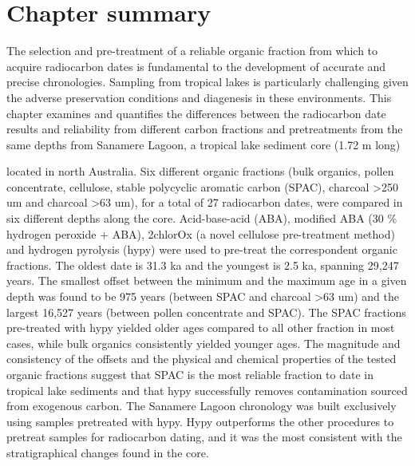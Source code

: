 \documentclass[
  12pt,
]{book}
\begin{document}
\hypertarget{chapter-summary}{%
\section{Chapter summary}\label{chapter-summary}}

The selection and pre-treatment of a reliable organic fraction from which to acquire radiocarbon dates is fundamental to the development of accurate and precise chronologies. Sampling from tropical lakes is particularly challenging given the adverse preservation conditions and diagenesis in these environments. This chapter examines and quantifies the differences between the radiocarbon date results and reliability from different carbon fractions and pretreatments from the same depths from Sanamere Lagoon, a tropical lake sediment core (1.72 m long)

located in north Australia. Six different organic fractions (bulk organics, pollen concentrate, cellulose, stable polycyclic aromatic carbon (SPAC), charcoal \textgreater250 um and charcoal \textgreater63 um), for a total of 27 radiocarbon dates, were compared in six different depths along the core. Acid-base-acid (ABA), modified ABA (30 \% hydrogen peroxide + ABA), 2chlorOx (a novel cellulose pre-treatment method) and hydrogen pyrolysis (hypy) were used to pre-treat the correspondent organic fractions.
The oldest date is 31.3 ka and the youngest is 2.5 ka, spanning 29,247 years. The smallest offset between the minimum and the maximum age in a given depth was found to be 975 years (between SPAC and charcoal \textgreater63 um) and the largest 16,527 years (between pollen concentrate and SPAC). The SPAC fractions pre-treated with hypy yielded older ages compared to all other fraction in most cases, while bulk organics consistently yielded younger ages. The magnitude and consistency of the offsets and the physical and chemical properties of the tested organic fractions suggest that SPAC is the most reliable fraction to date in tropical lake sediments and that hypy successfully removes contamination sourced from exogenous carbon.
The Sanamere Lagoon chronology was built exclusively using samples pretreated with hypy. Hypy outperforms the other procedures to pretreat samples for radiocarbon dating, and it was the most consistent with the stratigraphical changes found in the core.







  
\end{document}
